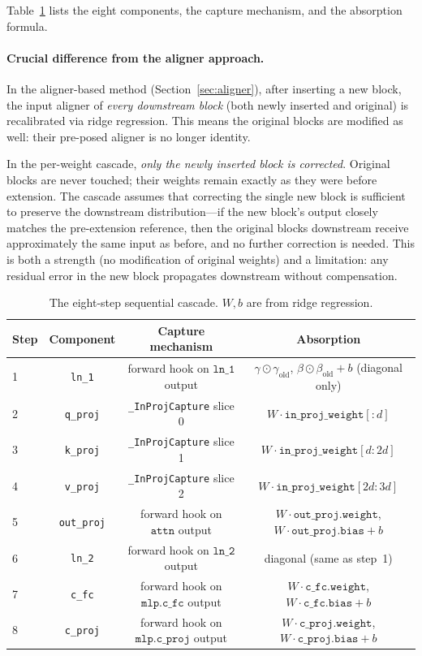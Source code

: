\documentclass[11pt,a4paper]{article}
\begin{document}
Table~\ref{tab:cascade} lists the eight components, the capture mechanism,
and the absorption formula.

\paragraph{Crucial difference from the aligner approach.}
In the aligner-based method (Section~\ref{sec:aligner}), after inserting a
new block, the input aligner of {\em every downstream block} (both newly
inserted and original) is recalibrated via ridge regression. This means the
original blocks are modified as well: their pre-posed aligner is no longer
identity.

In the per-weight cascade, {\em only the newly inserted block is corrected}.
Original blocks are never touched; their weights remain exactly as they were
before extension. The cascade assumes that correcting the single new block
is sufficient to preserve the downstream distribution---if the new block's
output closely matches the pre-extension reference, then the original blocks
downstream receive approximately the same input as before, and no further
correction is needed. This is both a strength (no modification of original
weights) and a limitation: any residual error in the new block propagates
downstream without compensation.

\begin{table}[ht]
\centering
\caption{The eight-step sequential cascade. $W, b$ are from ridge regression.}
\label{tab:cascade}
\begin{tabular}{lccc}
\toprule
Step & Component & Capture mechanism & Absorption \\
\midrule
1 & \texttt{ln\_1}    & forward hook on $\texttt{ln\_1}$ output &
      $\gamma \odot \gamma_{\text{old}}$, $\beta \odot \beta_{\text{old}} + b$
      (diagonal only) \\
2 & \texttt{q\_proj}  & \texttt{\_InProjCapture} slice 0 &
      $W \cdot \texttt{in\_proj\_weight}[:d]$ \\
3 & \texttt{k\_proj}  & \texttt{\_InProjCapture} slice 1 &
      $W \cdot \texttt{in\_proj\_weight}[d:2d]$ \\
4 & \texttt{v\_proj}  & \texttt{\_InProjCapture} slice 2 &
      $W \cdot \texttt{in\_proj\_weight}[2d:3d]$ \\
5 & \texttt{out\_proj}& forward hook on $\texttt{attn}$ output &
      $W \cdot \texttt{out\_proj.weight}$, $W \cdot \texttt{out\_proj.bias} + b$ \\
6 & \texttt{ln\_2}    & forward hook on $\texttt{ln\_2}$ output &
      diagonal (same as step~1) \\
7 & \texttt{c\_fc}    & forward hook on $\texttt{mlp.c\_fc}$ output &
      $W \cdot \texttt{c\_fc.weight}$, $W \cdot \texttt{c\_fc.bias} + b$ \\
8 & \texttt{c\_proj}  & forward hook on $\texttt{mlp.c\_proj}$ output &
      $W \cdot \texttt{c\_proj.weight}$, $W \cdot \texttt{c\_proj.bias} + b$ \\
\bottomrule
\end{tabular}
\end{table}
\end{document}
